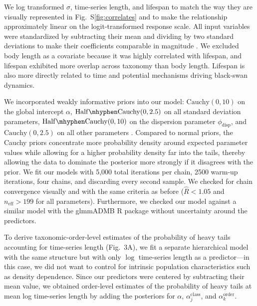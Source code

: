 We log transformed \(\sigma\), time-series length, and lifespan to match the
way they are visually represented in Fig.~S\ref{fig:correlates} and to make the
relationship approximately linear on the logit-transformed response scale. All
input variables were standardized by subtracting their mean and dividing by two
standard deviations to make their coefficients comparable in
magnitude \citep{gelman2008c}. We excluded body length as a covariate because it
was highly correlated with lifespan, and lifespan exhibited more overlap across
taxonomy than body length. Lifespan is also more directly related to time and
potential mechanisms driving black-swan dynamics.

We incorporated weakly informative priors into our model: \(\mathrm{Cauchy}(0,
10)\) on the global intercept \(\alpha\), \(\mathrm{Half\mhyphen Cauchy}(0,
2.5)\) on all standard deviation parameters, \(\mathrm{Half\mhyphen Cauchy}(0,
10)\) on the dispersion parameter \(\phi_\mathrm{disp}\), and
\(\mathrm{Cauchy}(0, 2.5)\) on all other parameters \citep{gelman2006c,
gelman2008d}. Compared to normal priors, the Cauchy priors concentrate more
probability density around expected parameter values while allowing for a
higher probability density far into the tails, thereby allowing the data to
dominate the posterior more strongly if it disagrees with the prior. We fit our
models with 5,000 total iterations per chain, 2500 warm-up iterations, four
chains, and discarding every second sample. We checked for chain convergence
visually and with the same criteria as before (\(\widehat{R} < 1.05\) and
\(n_\mathrm{eff} >199\) for all parameters). Furthermore, we checked our model
against a similar model with the glmmADMB \textsf{R} package \citep{glmmadmb}
without uncertainty around the predictors.

To derive taxonomic-order-level estimates of the probability of heavy tails
accounting for time-series length (Fig.~3A), we fit a separate hierarchical
model with the same structure but with only \(\log\) time-series length as a
predictor---in this case, we did not want to control for intrinsic population
characteristics such as density dependence. Since our predictors were centered
by subtracting their mean value, we obtained order-level estimates of the
probability of heavy tails at mean log time-series length by adding the
posteriors for \(\alpha\), \(\alpha^\mathrm{class}_j\), and
\(\alpha^\mathrm{order}_k\).

